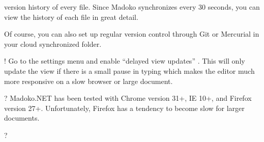 \documentclass{book}
\begin{document}
\begin{mdOl}[class={loose},data-line={74}]
\begin{mdLi}[data-line={104}]
\begin{mdP}[data-line={104}]
 version history of every file. Since Madoko synchronizes every 30
 seconds, you can view the history of each file in great detail.%
\end{mdP}%
\begin{mdP}[data-line={111}]%
{} Of course, you can also set up regular version control through Git
 or Mercurial in your cloud synchronized folder.%
\end{mdP}%
\end{mdLi}%
\begin{mdLi}[data-line={114}]%
\begin{mdP}[data-line={114}]%
{}%
{}!%
{}\mdBr
{} Go to the settings menu and enable %
{}{\textquotedblleft}delayed view updates{\textquotedblright}%
{}. This
 will only update the view if there is a small pause in typing which
 makes the editor much more responsive on a slow browser or large
 document.%
\end{mdP}%
\end{mdLi}%
\begin{mdLi}[data-line={120}]%
\begin{mdP}[data-line={120}]%
{}%
{}?%
{}\mdBr
{} Madoko.NET has been tested with Chrome version 31+, IE 10+, and
 Firefox version 27+. Unfortunately, Firefox has a tendency to
 become slow for larger documents.%
\end{mdP}%
\end{mdLi}%
\begin{mdLi}[data-line={125}]%
\begin{mdP}[data-line={125}]%
{}%
{}?%
{}{\mdNbsp}%
{} %
{}%
\end{mdP}%
\begin{mdUl}[class={list-dash,compact},data-line={126}]%
\begin{mdLi}[data-line={126}]%
{}%
{}%
\end{mdLi}%
\begin{mdLi}[data-line={127}]%
{}%
{}%
\end{mdLi}%
\begin{mdLi}[data-line={128}]%

\end{mdLi}
\end{mdUl}
\end{mdLi}
\end{mdOl}
\end{document}
